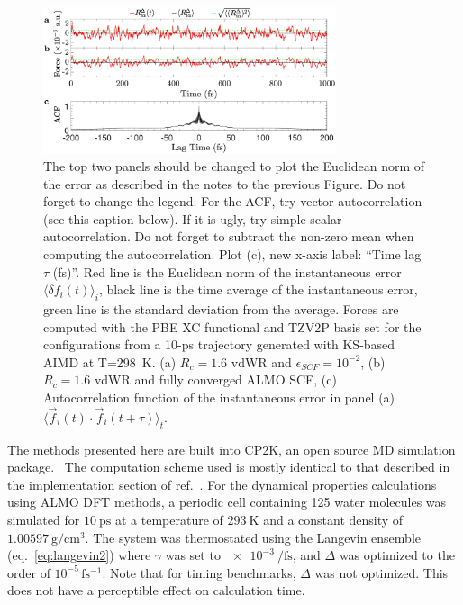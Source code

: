 \documentclass[aps,prl,reprint,amsmath,amssymb]{revtex4-1}
\begin{document}
\begin{figure}
\includegraphics[trim={0.6cm 0.7cm 0.7cm 0.3cm},clip,width=8.6cm]{DeltaForceComparison_with_ACF.eps}
\caption{\label{fig:randomforce} {\color{red} The top two panels should be changed to plot the Euclidean norm of the error as described in the notes to the previous Figure. Do not forget to change the legend. For the ACF, try vector autocorrelation (see this caption below). If it is ugly, try simple scalar autocorrelation. Do not forget to subtract the non-zero mean when computing the autocorrelation. Plot (c), new x-axis label: ``Time lag $\tau$ (fs)''.} 
Red line is the Euclidean norm of the instantaneous error $\langle \delta f_i(t) \rangle_i$, black line is the time average of the instantaneous error, green line is the standard deviation from the average. Forces are computed with the PBE XC functional and TZV2P basis set for the configurations from a 10-ps trajectory generated with KS-based AIMD at T=298~K. 
(a) $R_{c} = 1.6$ vdWR and $\epsilon_{SCF} = 10^{-2}$, 
(b) $R_{c} = 1.6$ vdWR and fully converged ALMO SCF,
(c) Autocorrelation function of the instantaneous error in panel (a) $\langle \vec{f}_i (t) \cdot \vec{f}_i(t+\tau) \rangle_t $.
}
\end{figure}


The methods presented here are built into CP2K, an open source MD simulation package.~\cite{www:cp2k} 
The computation scheme used is mostly identical to that described in the implementation section of ref.\ . 
For the dynamical properties calculations using ALMO DFT methods, a periodic cell containing 125 water molecules was simulated for $\SI{10}{\ps}$ at a temperature of $\SI{293}{\K}$ and a constant density of $\SI{1.00597}{\g\per\cm^{3}}$. 
The system was thermostated using the Langevin ensemble (eq.\ \ref{eq:langevin2}) where $\gamma$ was set to $\SI{e-3}{\per\fs}$, and $\Delta$ was optimized to the order of $10^{-5}\, \mathrm{fs^{-1}}$. 
Note that for timing benchmarks, $\Delta$ was not optimized. 
This does not have a perceptible effect on calculation time.
\end{document}
